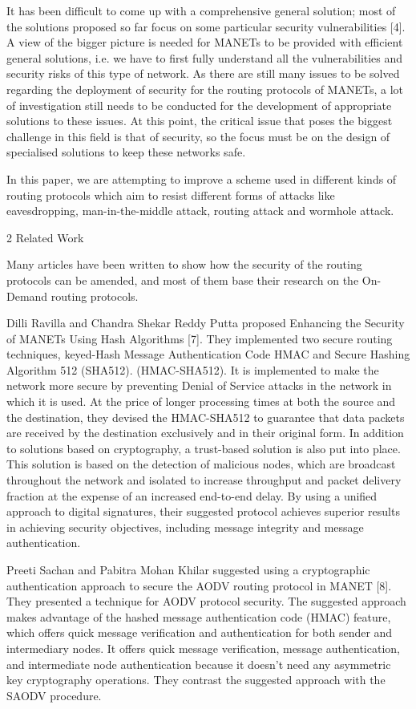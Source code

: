 \documentclass[10pt]{NSP1}
\begin{document}
It has been difficult to come up with a comprehensive general solution; most of the solutions proposed so far focus on some particular security vulnerabilities [4]. A view of the bigger picture is needed for MANETs to be provided with efficient general solutions, i.e. we have to first fully understand all the vulnerabilities and security risks of this type of network. As there are still many issues to be solved regarding the deployment of security for the routing protocols of MANETs, a lot of investigation still needs to be conducted for the development of appropriate solutions to these issues. At this point, the critical issue that poses the biggest challenge in this field is that of security, so the focus must be on the design of specialised solutions to keep these networks safe.

In this paper, we are attempting to improve a scheme used in different kinds of routing protocols which aim to resist different forms of attacks like eavesdropping, man-in-the-middle attack, routing attack and wormhole attack.

2 Related Work

Many articles have been written to show how the security of the routing protocols can be amended, and most of them base their research on the On-Demand routing protocols.

Dilli Ravilla and Chandra Shekar Reddy Putta proposed Enhancing the Security of MANETs Using Hash Algorithms [7]. They implemented two secure routing techniques, keyed-Hash Message Authentication Code HMAC and Secure Hashing Algorithm 512 (SHA512). (HMAC-SHA512). It is implemented to make the network more secure by preventing Denial of Service attacks in the network in which it is used. At the price of longer processing times at both the source and the destination, they devised the HMAC-SHA512 to guarantee that data packets are received by the destination exclusively and in their original form. In addition to solutions based on cryptography, a trust-based solution is also put into place. This solution is based on the detection of malicious nodes, which are broadcast throughout the network and isolated to increase throughput and packet delivery fraction at the expense of an increased end-to-end delay. By using a unified approach to digital signatures, their suggested protocol achieves superior results in achieving security objectives, including message integrity and message authentication.

Preeti Sachan and Pabitra Mohan Khilar suggested using a cryptographic authentication approach to secure the AODV routing protocol in MANET [8]. They presented a technique for AODV protocol security. The suggested approach makes advantage of the hashed message authentication code (HMAC) feature, which offers quick message verification and authentication for both sender and intermediary nodes. It offers quick message verification, message authentication, and intermediate node authentication because it doesn't need any asymmetric key cryptography operations. They contrast the suggested approach with the SAODV procedure.
\end{document}
